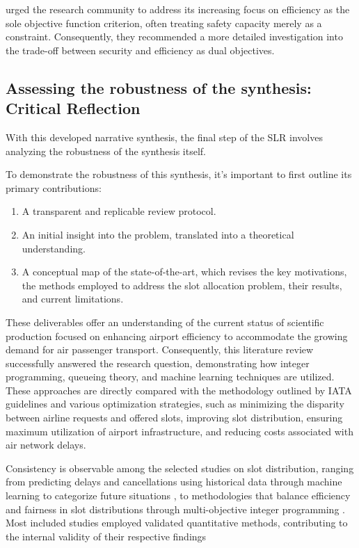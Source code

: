  urged the research community to address its increasing focus on efficiency as the sole objective function criterion, often treating safety capacity merely as a constraint. Consequently, they recommended a more detailed investigation into the trade-off between security and efficiency as dual objectives.


\subsection{Assessing the robustness of the synthesis: Critical Reflection}

With this developed narrative synthesis, the final step of the \acrshort{SLR} involves analyzing the robustness of the synthesis itself.

To demonstrate the robustness of this synthesis, it's important to first outline its primary contributions:

\begin{enumerate}
    \item A transparent and replicable review protocol.
    \item An initial insight into the problem, translated into a theoretical understanding.
    \item A conceptual map of the state-of-the-art, which revises the key motivations, the methods employed to address the slot allocation problem, their results, and current limitations.
\end{enumerate}

These deliverables offer an understanding of the current status of scientific production focused on enhancing airport efficiency to accommodate the growing demand for air passenger transport. Consequently, this literature review successfully answered the research question, demonstrating how integer programming, queueing theory, and machine learning techniques are utilized. These approaches are directly compared with the methodology outlined by IATA guidelines and various optimization strategies, such as minimizing the disparity between airline requests and offered slots, improving slot distribution, ensuring maximum utilization of airport infrastructure, and reducing costs associated with air network delays.

Consistency is observable among the selected studies on slot distribution, ranging from predicting delays and cancellations using historical data through machine learning to categorize future situations \cite{lambelho_assessing_2020, wang_distribution_2022}, to methodologies that balance efficiency and fairness in slot distributions through multi-objective integer programming \cite{corolli_time_2014, jacquillat_interairline_2018, jiang_decision_2021, keskin_optimal_2023, ribeiro2018optimization, wang_slot_2023}. Most included studies employed validated quantitative methods, contributing to the internal validity of their respective findings

